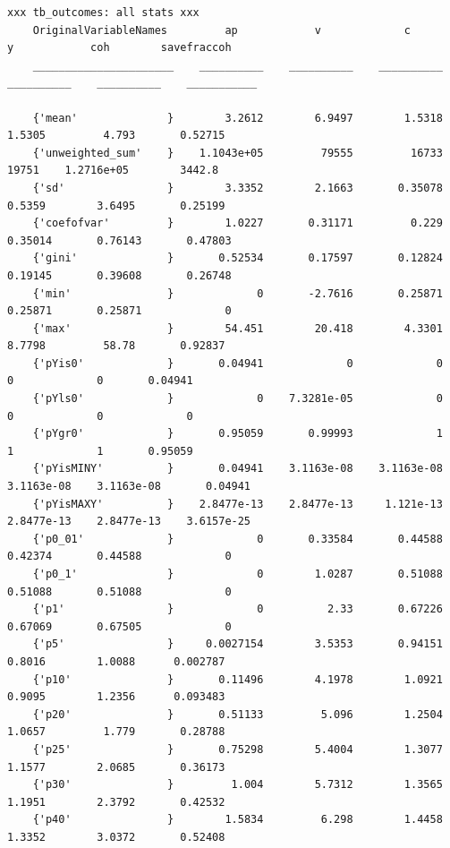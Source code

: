 \documentclass[
]{book}
\begin{document}
\begin{verbatim}
xxx tb_outcomes: all stats xxx
    OriginalVariableNames         ap            v             c             y            coh        savefraccoh
    ______________________    __________    __________    __________    __________    __________    ___________

    {'mean'              }        3.2612        6.9497        1.5318        1.5305         4.793       0.52715 
    {'unweighted_sum'    }    1.1043e+05         79555         16733         19751    1.2716e+05        3442.8 
    {'sd'                }        3.3352        2.1663       0.35078        0.5359        3.6495       0.25199 
    {'coefofvar'         }        1.0227       0.31171         0.229       0.35014       0.76143       0.47803 
    {'gini'              }       0.52534       0.17597       0.12824       0.19145       0.39608       0.26748 
    {'min'               }             0       -2.7616       0.25871       0.25871       0.25871             0 
    {'max'               }        54.451        20.418        4.3301        8.7798         58.78       0.92837 
    {'pYis0'             }       0.04941             0             0             0             0       0.04941 
    {'pYls0'             }             0    7.3281e-05             0             0             0             0 
    {'pYgr0'             }       0.95059       0.99993             1             1             1       0.95059 
    {'pYisMINY'          }       0.04941    3.1163e-08    3.1163e-08    3.1163e-08    3.1163e-08       0.04941 
    {'pYisMAXY'          }    2.8477e-13    2.8477e-13     1.121e-13    2.8477e-13    2.8477e-13    3.6157e-25 
    {'p0_01'             }             0       0.33584       0.44588       0.42374       0.44588             0 
    {'p0_1'              }             0        1.0287       0.51088       0.51088       0.51088             0 
    {'p1'                }             0          2.33       0.67226       0.67069       0.67505             0 
    {'p5'                }     0.0027154        3.5353       0.94151        0.8016        1.0088      0.002787 
    {'p10'               }       0.11496        4.1978        1.0921        0.9095        1.2356      0.093483 
    {'p20'               }       0.51133         5.096        1.2504        1.0657         1.779       0.28788 
    {'p25'               }       0.75298        5.4004        1.3077        1.1577        2.0685       0.36173 
    {'p30'               }         1.004        5.7312        1.3565        1.1951        2.3792       0.42532 
    {'p40'               }        1.5834         6.298        1.4458        1.3352        3.0372       0.52408 

\end{verbatim}
\end{document}
